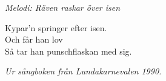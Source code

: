 {\footnotesize\textit{Melodi: Räven raskar över isen}}\par
\vspace{10pt}
\revrpt Kypar'n springer efter isen.\rpt\\
\revrpt Och får han lov\rpt\\
Så tar han punschflaskan med sig.\par
\vspace{10pt}
{\footnotesize\textit{Ur sångboken från Lundakarnevalen 1990.}}
